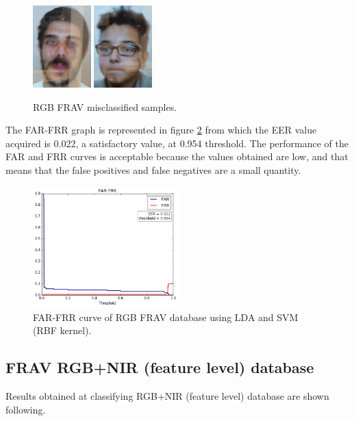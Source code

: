 \begin{figure}[htb]
\centering
\includegraphics[width=0.2\textwidth]{images_databases/frav_tablet_109.JPG}
\includegraphics[width=0.2\textwidth]{images_databases/frav_tablet_162.JPG}
\caption{RGB FRAV misclassified samples.} \label{fig:frav_miscl}
\end{figure}

The FAR-FRR graph is represented in figure \ref{fig:RGB_FRAV_FAR_FRR} from which the EER value acquired is 0.022, a satisfactory value, at 0.954 threshold. The performance of the FAR and FRR curves is acceptable because the values obtained are low, and that means that the false positives and false negatives are a small quantity.

\begin{figure}[htb]
\centering
\includegraphics[width=0.5\textwidth]{images/FAR-FRR/FRAV_LDA_SVM_RBF_FAR_FRR.png}
\caption{FAR-FRR curve of RGB FRAV database using LDA and SVM (RBF kernel).} \label{fig:RGB_FRAV_FAR_FRR}
\end{figure}


\subsection{FRAV RGB+NIR (feature level) database}
Results obtained at classifying RGB+NIR (feature level) database are shown following.\\

